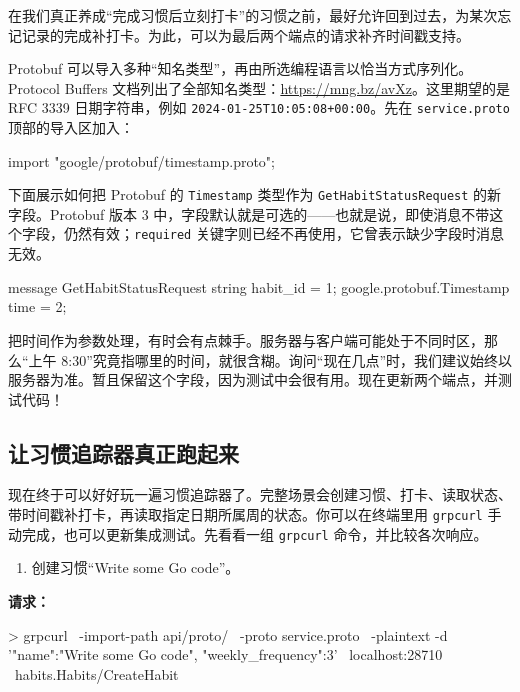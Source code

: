 在我们真正养成“完成习惯后立刻打卡”的习惯之前，最好允许回到过去，为某次忘记记录的完成补打卡。为此，可以为最后两个端点的请求补齐时间戳支持。

Protobuf 可以导入多种“知名类型”，再由所选编程语言以恰当方式序列化。Protocol Buffers 文档列出了全部知名类型：\url{https://mng.bz/avXz}。这里期望的是 RFC 3339 日期字符串，例如 \texttt{2024-01-25T10:05:08+00:00}。先在 \texttt{service.proto} 顶部的导入区加入：

\begin{protocode}[]
import "google/protobuf/timestamp.proto";
\end{protocode}

下面展示如何把 Protobuf 的 \texttt{Timestamp} 类型作为 \texttt{GetHabitStatusRequest} 的新字段。Protobuf 版本 3 中，字段默认就是可选的——也就是说，即使消息不带这个字段，仍然有效；\texttt{required} 关键字则已经不再使用，它曾表示缺少字段时消息无效。

\begin{protocode}[title={代码清单 10.38 \texttt{api/proto/service.proto}：导入并使用时间戳}]
message GetHabitStatusRequest {
    string habit_id = 1;
    google.protobuf.Timestamp time = 2;
}
\end{protocode}

把时间作为参数处理，有时会有点棘手。服务器与客户端可能处于不同时区，那么“上午 8:30”究竟指哪里的时间，就很含糊。询问“现在几点”时，我们建议始终以服务器为准。暂且保留这个字段，因为测试中会很有用。现在更新两个端点，并测试代码！

\subsection{让习惯追踪器真正跑起来}

现在终于可以好好玩一遍习惯追踪器了。完整场景会创建习惯、打卡、读取状态、带时间戳补打卡，再读取指定日期所属周的状态。你可以在终端里用 \texttt{grpcurl} 手动完成，也可以更新集成测试。先看看一组 \texttt{grpcurl} 命令，并比较各次响应。

\begin{enumerate}
  \item 创建习惯“Write some Go code”。
\end{enumerate}

\noindent\textbf{请求：}
\begin{shellcode}[]
> grpcurl \
-import-path api/proto/ \
-proto service.proto \
-plaintext -d '{"name":"Write some Go code", "weekly_frequency":3}' \
localhost:28710 \
habits.Habits/CreateHabit
\end{shellcode}

